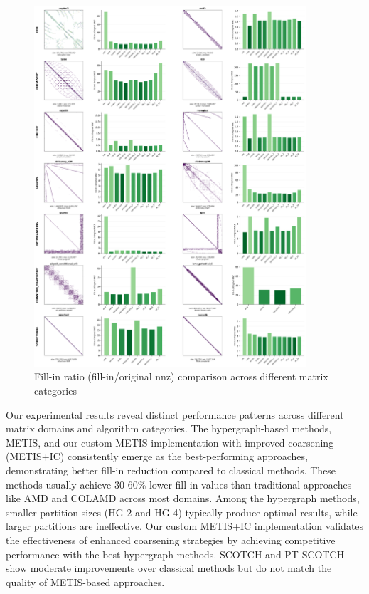\begin{figure}[H]
\centering
\includegraphics[width=0.9\textwidth]{fig/res/fillin_all_categories.png}
\caption{Fill-in ratio (fill-in/original nnz) comparison across different matrix categories}
\label{fig:fillin-categories}
\end{figure}

Our experimental results reveal distinct performance patterns across different matrix domains and algorithm categories. The hypergraph-based methods, METIS, and our custom METIS implementation with improved coarsening (METIS+IC) consistently emerge as the best-performing approaches, demonstrating better fill-in reduction compared to classical methods. These methods usually achieve 30-60\% lower fill-in values than traditional approaches like AMD and COLAMD across most domains. Among the hypergraph methods, smaller partition sizes (HG-2 and HG-4) typically produce optimal results, while larger partitions are ineffective. Our custom METIS+IC implementation validates the effectiveness of enhanced coarsening strategies by achieving competitive performance with the best hypergraph methods. SCOTCH and PT-SCOTCH show moderate improvements over classical methods but do not match the quality of METIS-based approaches.

